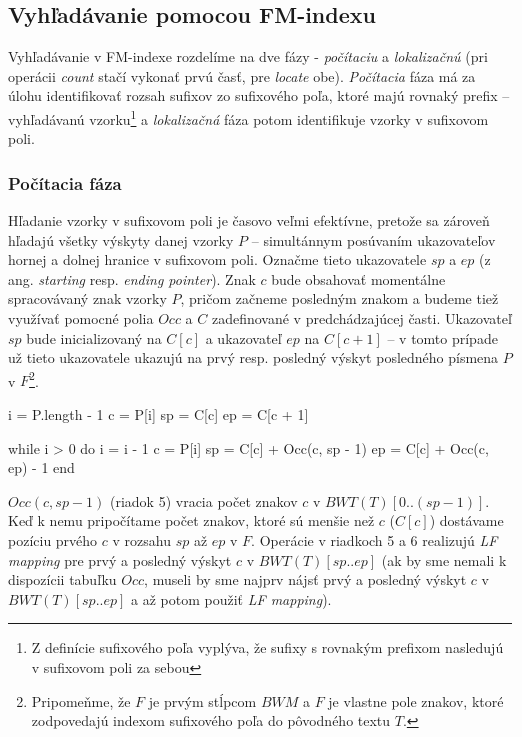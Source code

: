     \subsection{Vyhľadávanie pomocou FM-indexu}
    Vyhľadávanie v FM-indexe rozdelíme na dve fázy - \emph{počítaciu} a \emph{lokalizačnú} (pri operácii \emph{count} stačí vykonať prvú časť, pre \emph{locate} obe). \emph{Počítacia} fáza má za úlohu identifikovať rozsah sufixov zo sufixového poľa, ktoré majú rovnaký prefix -- vyhľadávanú vzorku\footnote{Z definície sufixového poľa vyplýva, že sufixy s rovnakým prefixom nasledujú v sufixovom poli za sebou} a \emph{lokalizačná} fáza potom identifikuje vzorky v sufixovom poli.
    
    \subsubsection{Počítacia fáza}
    Hľadanie vzorky v sufixovom poli je časovo veľmi efektívne, pretože sa zároveň hľadajú všetky výskyty danej vzorky $P$ -- simultánnym posúvaním ukazovateľov hornej a dolnej hranice v sufixovom poli. Označme tieto ukazovatele $sp$ a $ep$ (z ang. \emph{starting} resp. \emph{ending pointer}). Znak $c$ bude obsahovať momentálne spracovávaný znak vzorky $P$, pričom začneme posledným znakom a budeme tiež využívať pomocné polia $Occ$ a $C$ zadefinované v predchádzajúcej časti. Ukazovateľ $sp$ bude inicializovaný na $C[c]$ a ukazovateľ $ep$ na $C[c + 1]$ -- v tomto prípade už tieto ukazovatele ukazujú na prvý resp. posledný výskyt posledného písmena $P$ v $F$\footnote{Pripomeňme, že $F$ je prvým stĺpcom $BWM$ a $F$ je vlastne pole znakov, ktoré zodpovedajú indexom sufixového poľa do pôvodného textu $T$.}.
    
    \bigskip
    
    \begin{pseudocode}[label=lst:fm_search_algorithm,caption={Algoritmus na hľadanie vzorky pomocou FM-indexu}]
i = P.length - 1
c = P[i]
sp = C[c]
ep = C[c + 1]

while i > 0 do
  i = i - 1
  c = P[i]
  sp = C[c] + Occ(c, sp - 1)
  ep = C[c] + Occ(c, ep) - 1
end
    \end{pseudocode}
    
    $Occ(c, sp - 1)$ (riadok 5) vracia počet znakov $c$ v $BWT(T)[0..(sp - 1)]$. Keď k nemu pripočítame počet znakov, ktoré sú menšie než $c$ ($C[c]$) dostávame pozíciu prvého $c$ v rozsahu $sp$ až $ep$ v $F$. Operácie v riadkoch 5 a 6 realizujú \emph{LF mapping} pre prvý a posledný výskyt $c$ v $BWT(T)[sp..ep]$ (ak by sme nemali k dispozícii tabuľku $Occ$, museli by sme najprv nájsť prvý a posledný výskyt $c$ v $BWT(T)[sp..ep]$ a až potom použiť \emph{LF mapping}).
    
